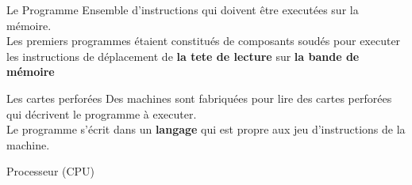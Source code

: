 \begin{frame}{Le Programme}
    Ensemble d'instructions qui doivent être executées sur la mémoire. \\
    \newline
    Les premiers programmes étaient constitués de composants soudés pour executer les instructions de déplacement de \textbf{la tete de lecture} sur \textbf{la bande de mémoire}
\end{frame}

\begin{frame}{Les cartes perforées}
    Des machines sont fabriquées pour lire des cartes perforées qui décrivent le programme à executer. \\
    Le programme s'écrit dans un \textbf{langage} qui est propre aux jeu d'instructions de la machine.
\end{frame}

\begin{frame}{Processeur (CPU)}
\end{frame}




